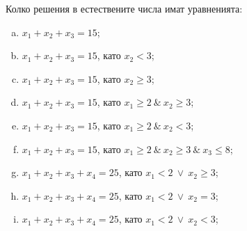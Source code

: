 \begin{problem}
  Колко решения в естествените числа имат уравненията:
  \begin{enumerate}[a)]
  \item
    $x_1+x_2+x_3 = 15$;
  \item
    $x_1 + x_2 + x_3 = 15$, като $x_2 < 3$;
  \item
    $x_1 + x_2 + x_3 = 15$, като $x_2 \geq 3$;
  \item
    $x_1+x_2+x_3 = 15$, като $x_1 \geq 2\ \&\ x_2 \geq 3$;
  \item
    $x_1+x_2+x_3 = 15$, като $x_1 \geq 2\ \&\ x_2 < 3$;
  \item
    $x_1+x_2+x_3 = 15$, като $x_1 \geq 2\ \&\ x_2 \geq 3\ \&\ x_3 \leq 8$;
  \item
    $x_1+x_2+x_3+x_4 = 25$, като $x_1 < 2\ \vee\ x_2 \geq 3$;
  \item
    $x_1+x_2+x_3+x_4 = 25$, като $x_1 < 2\ \vee\ x_2 = 3$;
  \item
    $x_1+x_2+x_3+x_4 = 25$, като $x_1 < 2\ \vee\ x_2 < 3$;
  \end{enumerate}
\end{problem}
